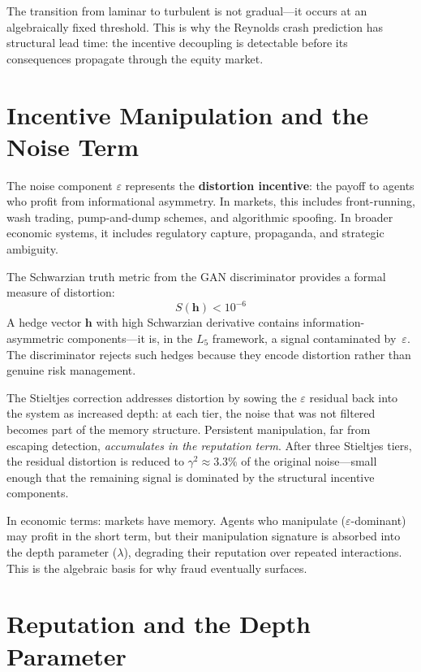 The transition from laminar to turbulent is not gradual---it occurs at an algebraically fixed threshold. This is why the Reynolds crash prediction has structural lead time: the incentive decoupling is detectable before its consequences propagate through the equity market.

\section{Incentive Manipulation and the Noise Term}

The noise component $\varepsilon$ represents the \textbf{distortion incentive}: the payoff to agents who profit from informational asymmetry. In markets, this includes front-running, wash trading, pump-and-dump schemes, and algorithmic spoofing. In broader economic systems, it includes regulatory capture, propaganda, and strategic ambiguity.

The Schwarzian truth metric from the GAN discriminator provides a formal measure of distortion:
\begin{equation}
    S(\mathbf{h}) < 10^{-6}
\end{equation}
A hedge vector $\mathbf{h}$ with high Schwarzian derivative contains information-asymmetric components---it is, in the $L_5$ framework, a signal contaminated by~$\varepsilon$. The discriminator rejects such hedges because they encode distortion rather than genuine risk management.

The Stieltjes correction addresses distortion by sowing the $\varepsilon$ residual back into the system as increased depth: at each tier, the noise that was not filtered becomes part of the memory structure. Persistent manipulation, far from escaping detection, \emph{accumulates in the reputation term}. After three Stieltjes tiers, the residual distortion is reduced to $\gamma^2 \approx 3.3\%$ of the original noise---small enough that the remaining signal is dominated by the structural incentive components.

In economic terms: markets have memory. Agents who manipulate ($\varepsilon$-dominant) may profit in the short term, but their manipulation signature is absorbed into the depth parameter ($\lambda$), degrading their reputation over repeated interactions. This is the algebraic basis for why fraud eventually surfaces.

\section{Reputation and the Depth Parameter}

